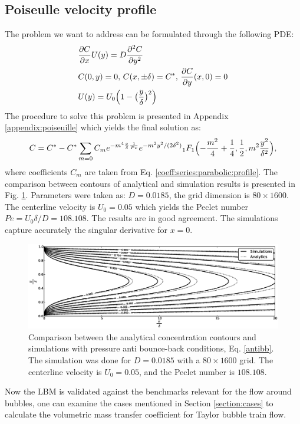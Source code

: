 \documentclass[preprint,12pt]{elsarticle}
\newcommand{\beq}{\begin{equation}}
\newcommand{\feq}{\end{equation}}
\newcommand{\cstar}{C^{*}}
\begin{document}
\subsection{Poiseulle velocity profile}
The problem we want to address can be formulated through the following PDE:
\beq
\begin{aligned}
&\frac{\partial C}{\partial x} U(y)=D\frac{\partial^2 C}{\partial y^2}\\
&C(0,y)=0,\, C(x,\pm \delta)=\cstar,\, \frac{\partial C}{\partial y }(x,0)=0\\
&U(y)=U_0 \Bigl(1-\bigl(\frac{y}{\delta}\bigr)^2\Bigr)
\end{aligned}
\feq
The procedure to solve this problem is presented in Appendix \ref{appendix:poiseuille} which yields
the final solution as:
\begin{equation}
C=\cstar-\cstar \sum_{m=0}{C_m e^{-m^4 \frac{x}{\delta}\frac{1}{Pe}} e^{-m^2
y^2/(2\delta^2)}{_1F_1}\Bigl(-\frac{m^2}{4}+\frac{1}{4},\frac{1}{2},m^2 \frac{y^2}{\delta^2}\Bigr)},
\end{equation}
where coefficients $C_m$ are taken from Eq. \ref{coeff:series:parabolic:profile}. The comparison
between contours of analytical and simulation results is presented in Fig.
\ref{fig:parabolic:comparison}. Parameters were taken as: $D=0.0185$, the grid dimension is $80\times1600$. The centerline velocity is  $U_0=0.05$
which yields the Peclet number $Pe=U_0 \delta / D= 108.108$.
The results are in good agreement. The simulations capture accurately the singular derivative for $x=0$.
\begin{figure}[htb!]
\includegraphics[width=\textwidth]{parabolic_profile_comparison.eps}
\caption{Comparison between the analytical concentration contours and simulations with pressure
anti bounce-back conditions, Eq. \ref{antibb}. The simulation was done for $D=0.0185$ with a
$80\times1600$ grid. The centerline velocity is $U_0=0.05$, and the Peclet number is $108.108$. \label{fig:parabolic:comparison}}
\end{figure}

Now the LBM is validated against the benchmarks relevant for the flow around bubbles, one can
examine the cases mentioned in Section
\ref{section:cases} to calculate the volumetric mass transfer coefficient for Taylor bubble train flow.
\end{document}
